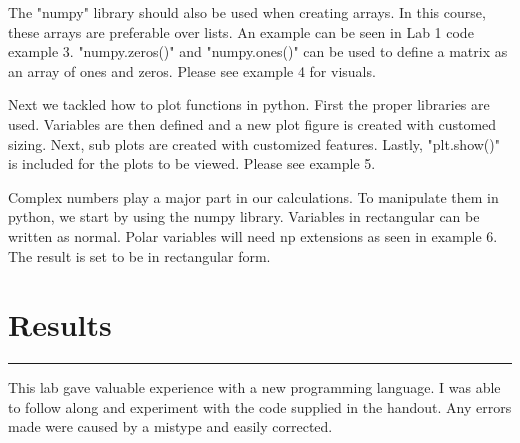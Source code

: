 \documentclass[12pt]{report}
\begin{document}
The "numpy" library should also be used when creating arrays. In this course, these arrays are preferable over lists. An example can be seen in Lab 1 code example 3. 
"numpy.zeros()" and "numpy.ones()" can be used to define a matrix as an array of ones and zeros. Please see example 4 for visuals.\par 

Next we tackled how to plot functions in python. First the proper libraries are used. Variables are then defined and a new plot figure is created with customed sizing. Next, sub plots are created with customized features. Lastly, "plt.show()" is included for the plots to be viewed. Please see example 5.\par

Complex numbers play a major part in our calculations. To manipulate them in python, we start by using the numpy library. Variables in rectangular can be written as normal. Polar variables will need np extensions as seen in example 6. The result is set to be in rectangular form. 
\newpage

\section*{Results}
\hrule
\vspace{1cm}
\setlength{\parindent}{5ex}
This lab gave valuable experience with a new programming language. I was able to follow along and experiment with the code supplied in the handout. Any errors made were caused by a mistype and easily corrected. \par

\end{document}
